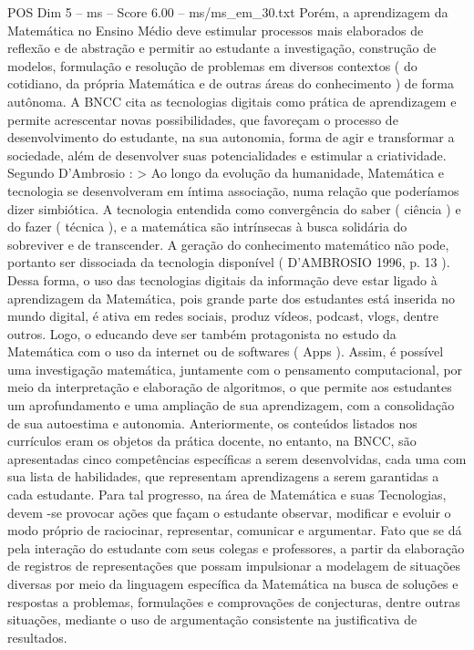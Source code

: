 \begin{textsample}{POS Dim 5 – ms – Score 6.00 – ms/ms\_em\_30.txt}
Porém, a aprendizagem da Matemática no Ensino Médio deve estimular processos mais elaborados de reflexão e de abstração e permitir ao estudante a investigação, construção de modelos, formulação e resolução de problemas em diversos contextos ( do cotidiano, da própria Matemática e de outras áreas do conhecimento ) de forma autônoma.
A BNCC cita as tecnologias digitais como prática de aprendizagem e permite acrescentar novas possibilidades, que favoreçam o processo de desenvolvimento do estudante, na sua autonomia, forma de agir e transformar a sociedade, além de desenvolver suas potencialidades e estimular a criatividade.
Segundo D’Ambrosio : > Ao longo da evolução da humanidade, Matemática e tecnologia se desenvolveram em íntima associação, numa relação que poderíamos dizer simbiótica.
A tecnologia entendida como convergência do saber ( ciência ) e do fazer ( técnica ), e a matemática são intrínsecas à busca solidária do sobreviver e de transcender.
A geração do conhecimento matemático não pode, portanto ser dissociada da tecnologia disponível ( D’AMBROSIO 1996, p. 13 ).
Dessa forma, o uso das tecnologias digitais da informação deve estar ligado à aprendizagem da Matemática, pois grande parte dos estudantes está inserida no mundo digital, é ativa em redes sociais, produz vídeos, podcast, vlogs, dentre outros.
Logo, o educando deve ser também protagonista no estudo da Matemática com o uso da internet ou de softwares ( Apps ).
Assim, é possível uma investigação matemática, juntamente com o pensamento computacional, por meio da interpretação e elaboração de algoritmos, o que permite aos estudantes um aprofundamento e uma ampliação de sua aprendizagem, com a consolidação de sua autoestima e autonomia.
Anteriormente, os conteúdos listados nos currículos eram os objetos da prática docente, no entanto, na BNCC, são apresentadas cinco competências específicas a serem desenvolvidas, cada uma com sua lista de habilidades, que representam aprendizagens a serem garantidas a cada estudante.
Para tal progresso, na área de Matemática e suas Tecnologias, devem -se provocar ações que façam o estudante observar, modificar e evoluir o modo próprio de raciocinar, representar, comunicar e argumentar.
Fato que se dá pela interação do estudante com seus colegas e professores, a partir da elaboração de registros de representações que possam impulsionar a modelagem de situações diversas por meio da linguagem específica da Matemática na busca de soluções e respostas a problemas, formulações e comprovações de conjecturas, dentre outras situações, mediante o uso de argumentação consistente na justificativa de resultados.

\end{textsample}
